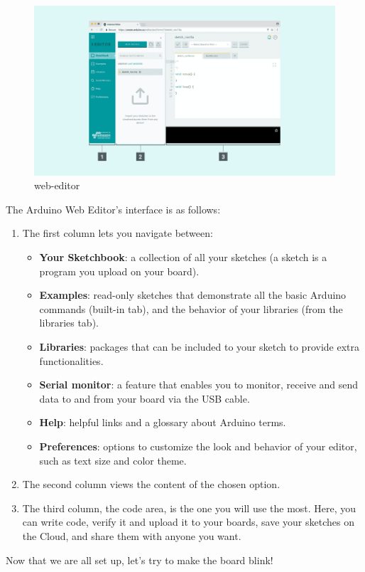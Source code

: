 \begin{figure}
	\begin{center}
		\includegraphics[width=0.7\linewidth]{Images/Arduino/web-editor.png}
		\caption{web-editor}
		\label{web-editor}
	\end{center}
\end{figure}
The Arduino Web Editor’s interface is as follows: 
\begin{enumerate}
	\item The first column lets you navigate between:
	\begin{itemize}
		\item \textbf{Your Sketchbook}: a collection of all your sketches (a sketch is a program you upload on your board).
		\item \textbf{Examples}: read-only sketches that demonstrate all the basic Arduino commands (built-in tab), and the behavior of your libraries (from the libraries tab).
		\item \textbf{Libraries}: packages that can be included to your sketch to provide extra functionalities.
		\item \textbf{Serial monitor}: a feature that enables you to monitor, receive and send data to and from your board via the USB cable.
		\item \textbf{Help}: helpful links and a glossary about Arduino terms.
		\item \textbf{Preferences}: options to customize the look and behavior of your editor, such as text size and color theme.		
	\end{itemize}
	\item The second column views the content of the chosen option.
	\item The third column, the code area, is the one you will use the most. Here, you can write code, verify it and upload it to your boards, save your sketches on the Cloud, and share them with anyone you want.
\end{enumerate}

Now that we are all set up, let’s try to make the board blink!

